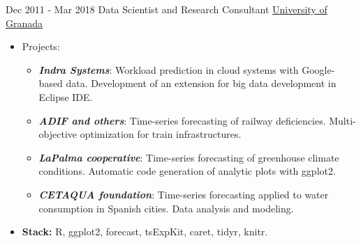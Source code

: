 \documentclass[letterpaper]{twentysecondcv} %
\begin{document}
\begin{twenty}
	  \twentyitem
    	{Dec 2011 -}
		{Mar 2018}
        {Data Scientist and Research Consultant}
        {\href{https://www.indracompany.com/en/}{University of Granada}}
        {
        \begin{itemize}
        	\item Projects:
        	\begin{itemize}
        		\item \textbf{\textit{Indra Systems}}: Workload prediction in cloud systems with Google-based data. Development of an extension for big data development in Eclipse IDE.
        		\item \textbf{\textit{ADIF and others}}: Time-series forecasting of railway deficiencies. Multi-objective optimization for train infrastructures.
        		\item \textbf{\textit{LaPalma cooperative}}: Time-series forecasting of greenhouse climate conditions. Automatic code generation of analytic plots with ggplot2.
        		\item \textbf{\textit{CETAQUA foundation}}: Time-series forecasting applied to water consumption in Spanish cities. Data analysis and modeling.
        	\end{itemize}
        	\item \textbf{Stack:} R, ggplot2, forecast, tsExpKit, caret, tidyr, knitr.
        

\end{itemize}}
\end{twenty}
\end{document}
